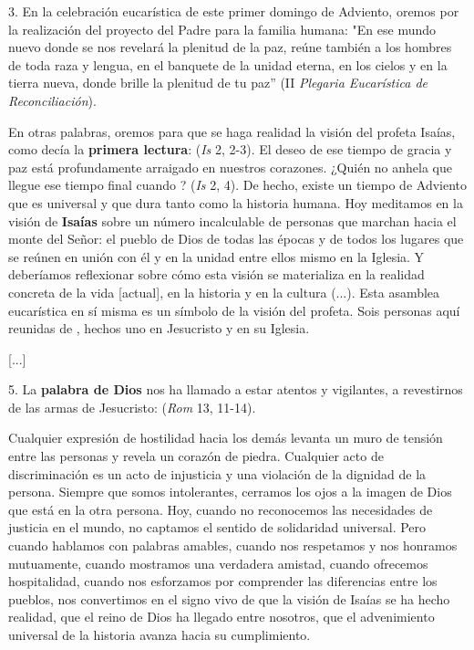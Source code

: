 \begin{body}
	3. En la celebración eucarística de este primer domingo de Adviento, oremos por la realización del proyecto del Padre para la familia humana: "En ese mundo nuevo donde se nos revelará la plenitud de la paz, reúne también a los hombres de toda raza y lengua, en el banquete de la unidad eterna, en los cielos y en la tierra nueva, donde brille la plenitud de tu paz'' (II \emph{Plegaria Eucarística de Reconciliación}).
	
	En otras palabras, oremos para que se haga realidad la visión del profeta Isaías, como decía la \textbf{primera lectura}:  (\emph{Is} 2, 2-3). El deseo de ese tiempo de gracia y paz está profundamente arraigado en nuestros corazones. ¿Quién no anhela que llegue ese tiempo final cuando ? (\emph{Is} 2, 4). De hecho, existe un tiempo de Adviento que es universal y que dura tanto como la historia humana. Hoy meditamos en la visión de \textbf{Isaías} sobre un número incalculable de personas que marchan hacia el monte del Señor: el pueblo de Dios de todas las épocas y de todos los lugares que se reúnen en unión con él y en la unidad entre ellos mismo en la Iglesia. Y deberíamos reflexionar sobre cómo esta visión se materializa en la realidad concreta de la vida {[}actual{]}, en la historia y en la cultura (...). Esta asamblea eucarística en sí misma es un símbolo de la visión del profeta. Sois personas aquí reunidas de , hechos uno en Jesucristo y en su Iglesia.
	
	{[}...{]}
	
	5. La \textbf{palabra de Dios} nos ha llamado a estar atentos y vigilantes, a revestirnos de las armas de Jesucristo:  (\emph{Rom} 13, 11-14).
	
	Cualquier expresión de hostilidad hacia los demás levanta un muro de tensión entre las personas y revela un corazón de piedra. Cualquier acto de discriminación es un acto de injusticia y una violación de la dignidad de la persona. Siempre que somos intolerantes, cerramos los ojos a la imagen de Dios que está en la otra persona. Hoy, cuando no reconocemos las necesidades de justicia en el mundo, no captamos el sentido de solidaridad universal. Pero cuando hablamos con palabras amables, cuando nos respetamos y nos honramos mutuamente, cuando mostramos una verdadera amistad, cuando ofrecemos hospitalidad, cuando nos esforzamos por comprender las diferencias entre los pueblos, nos convertimos en el signo vivo de que la visión de Isaías se ha hecho realidad, que el reino de Dios ha llegado entre nosotros, que el advenimiento universal de la historia avanza hacia su cumplimiento.
	

\end{body}
